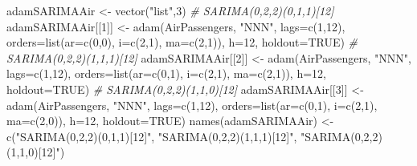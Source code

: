 \documentclass[
]{book}
\newenvironment{Shaded}{\begin{snugshade}}{\end{snugshade}}
\newcommand{\AttributeTok}[1]{\textcolor[rgb]{0.77,0.63,0.00}{#1}}
\newcommand{\CommentTok}[1]{\textcolor[rgb]{0.56,0.35,0.01}{\textit{#1}}}
\newcommand{\ConstantTok}[1]{\textcolor[rgb]{0.00,0.00,0.00}{#1}}
\newcommand{\DecValTok}[1]{\textcolor[rgb]{0.00,0.00,0.81}{#1}}
\newcommand{\FunctionTok}[1]{\textcolor[rgb]{0.00,0.00,0.00}{#1}}
\newcommand{\NormalTok}[1]{#1}
\newcommand{\OtherTok}[1]{\textcolor[rgb]{0.56,0.35,0.01}{#1}}
\newcommand{\StringTok}[1]{\textcolor[rgb]{0.31,0.60,0.02}{#1}}
\theoremstyle{definition}
\theoremstyle{definition}
\theoremstyle{definition}
\theoremstyle{definition}
\theoremstyle{remark}
\begin{document}
\begin{Shaded}
\begin{Highlighting}[]
\NormalTok{adamSARIMAAir }\OtherTok{\textless{}{-}} \FunctionTok{vector}\NormalTok{(}\StringTok{"list"}\NormalTok{,}\DecValTok{3}\NormalTok{)}
\CommentTok{\# SARIMA(0,2,2)(0,1,1)[12]}
\NormalTok{adamSARIMAAir[[}\DecValTok{1}\NormalTok{]] }\OtherTok{\textless{}{-}} \FunctionTok{adam}\NormalTok{(AirPassengers, }\StringTok{"NNN"}\NormalTok{, }\AttributeTok{lags=}\FunctionTok{c}\NormalTok{(}\DecValTok{1}\NormalTok{,}\DecValTok{12}\NormalTok{),}
                           \AttributeTok{orders=}\FunctionTok{list}\NormalTok{(}\AttributeTok{ar=}\FunctionTok{c}\NormalTok{(}\DecValTok{0}\NormalTok{,}\DecValTok{0}\NormalTok{), }\AttributeTok{i=}\FunctionTok{c}\NormalTok{(}\DecValTok{2}\NormalTok{,}\DecValTok{1}\NormalTok{),}
                                       \AttributeTok{ma=}\FunctionTok{c}\NormalTok{(}\DecValTok{2}\NormalTok{,}\DecValTok{1}\NormalTok{)),}
                           \AttributeTok{h=}\DecValTok{12}\NormalTok{, }\AttributeTok{holdout=}\ConstantTok{TRUE}\NormalTok{)}
\CommentTok{\# SARIMA(0,2,2)(1,1,1)[12]}
\NormalTok{adamSARIMAAir[[}\DecValTok{2}\NormalTok{]] }\OtherTok{\textless{}{-}} \FunctionTok{adam}\NormalTok{(AirPassengers, }\StringTok{"NNN"}\NormalTok{, }\AttributeTok{lags=}\FunctionTok{c}\NormalTok{(}\DecValTok{1}\NormalTok{,}\DecValTok{12}\NormalTok{),}
                           \AttributeTok{orders=}\FunctionTok{list}\NormalTok{(}\AttributeTok{ar=}\FunctionTok{c}\NormalTok{(}\DecValTok{0}\NormalTok{,}\DecValTok{1}\NormalTok{), }\AttributeTok{i=}\FunctionTok{c}\NormalTok{(}\DecValTok{2}\NormalTok{,}\DecValTok{1}\NormalTok{),}
                                       \AttributeTok{ma=}\FunctionTok{c}\NormalTok{(}\DecValTok{2}\NormalTok{,}\DecValTok{1}\NormalTok{)),}
                           \AttributeTok{h=}\DecValTok{12}\NormalTok{, }\AttributeTok{holdout=}\ConstantTok{TRUE}\NormalTok{)}
\CommentTok{\# SARIMA(0,2,2)(1,1,0)[12]}
\NormalTok{adamSARIMAAir[[}\DecValTok{3}\NormalTok{]] }\OtherTok{\textless{}{-}} \FunctionTok{adam}\NormalTok{(AirPassengers, }\StringTok{"NNN"}\NormalTok{, }\AttributeTok{lags=}\FunctionTok{c}\NormalTok{(}\DecValTok{1}\NormalTok{,}\DecValTok{12}\NormalTok{),}
                           \AttributeTok{orders=}\FunctionTok{list}\NormalTok{(}\AttributeTok{ar=}\FunctionTok{c}\NormalTok{(}\DecValTok{0}\NormalTok{,}\DecValTok{1}\NormalTok{), }\AttributeTok{i=}\FunctionTok{c}\NormalTok{(}\DecValTok{2}\NormalTok{,}\DecValTok{1}\NormalTok{),}
                                       \AttributeTok{ma=}\FunctionTok{c}\NormalTok{(}\DecValTok{2}\NormalTok{,}\DecValTok{0}\NormalTok{)),}
                           \AttributeTok{h=}\DecValTok{12}\NormalTok{, }\AttributeTok{holdout=}\ConstantTok{TRUE}\NormalTok{)}
\FunctionTok{names}\NormalTok{(adamSARIMAAir) }\OtherTok{\textless{}{-}} \FunctionTok{c}\NormalTok{(}\StringTok{"SARIMA(0,2,2)(0,1,1)[12]"}\NormalTok{,}
                          \StringTok{"SARIMA(0,2,2)(1,1,1)[12]"}\NormalTok{,}
                          \StringTok{"SARIMA(0,2,2)(1,1,0)[12]"}\NormalTok{)}
\end{Highlighting}
\end{Shaded}
\end{document}
